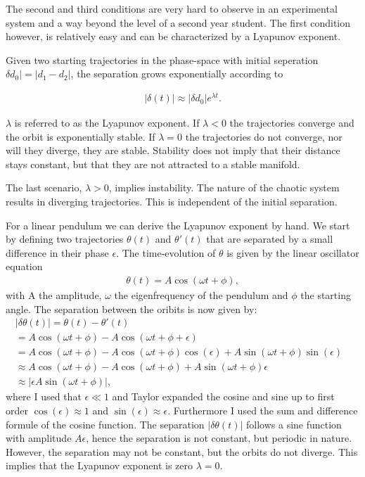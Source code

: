 \documentclass{article}
\begin{document}
The second and third conditions are very hard to observe in an experimental system and a way beyond the level of a second year student. The first condition however, is relatively easy and can be characterized by a Lyapunov exponent.

Given two starting trajectories in the phase-space with initial seperation $\delta d_0| = |d_1-d_2|$, the separation grows exponentially according to

\begin{align}
    |\delta(t)|\approx |\delta d_0|e^{\lambda t}.
    \label{Eq. Lyapunov}
\end{align}

$\lambda$ is referred to as the Lyapunov exponent. If $\lambda < 0 $ the trajectories converge and the orbit is exponentially stable. If $\lambda = 0$ the trajectories do not converge, nor will they diverge, they are stable. Stability does not imply that their distance stays constant, but that they are not attracted to a stable manifold.

The last scenario, $\lambda>0$, implies instability. The nature of the chaotic system results in diverging trajectories. This is independent of the initial separation.

For a linear pendulum we can derive the Lyapunov exponent by hand. We start by defining two trajectories $\theta(t)$ and $\theta'(t)$ that are separated by a small difference in their phase $\epsilon$. The time-evolution of $\theta$ is given by the linear oscillator equation
\begin{align}
    \theta(t) =A\cos(\omega t + \phi),
\end{align}
with A the amplitude, $\omega$ the eigenfrequency of the pendulum and $\phi$ the starting angle. The separation between the oribits is now given by:
\begin{align}
    |\delta \theta(t)| = \theta(t)-\theta'(t) & \\
    = A\cos(\omega t + \phi) - A\cos(\omega t +\phi +\epsilon) & \\
    = A\cos(\omega t + \phi) - A\cos(\omega t +\phi)\cos(\epsilon) +A\sin(\omega t +\phi)\sin(\epsilon) & \\
    \approx A\cos(\omega t + \phi) - A\cos(\omega t +\phi) +A\sin(\omega t +\phi)\epsilon & \\
    \approx  |\epsilon A \sin(\omega t + \phi)|,
\end{align}
where I used that $\epsilon \ll 1 $ and Taylor expanded the cosine and sine up to first order $\cos(\epsilon)\approx1$ and $\sin(\epsilon)\approx\epsilon$. Furthermore I used the sum and difference formule of the cosine function. The separation $|\delta\theta(t)|$ follows a sine function with amplitude $A\epsilon$, hence the separation is not constant, but periodic in nature. However, the separation may not be constant, but the orbits do not diverge. This implies that the Lyapunov exponent is zero $\lambda =0$. 
\end{document}
